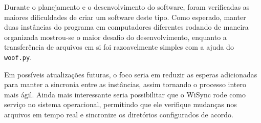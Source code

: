 \documentclass[12pt,a4paper]{ufpr}
\begin{document}
Durante o planejamento e o desenvolvimento do software, foram verificadas as maiores dificuldades de criar um software deste tipo.
Como esperado, manter duas instâncias do programa em computadores diferentes rodando de maneira organizada mostrou-se o maior desafio do desenvolvimento, enquanto a transferência de arquivos em si foi razoavelmente simples com a ajuda do \texttt{woof.py}.

Em possíveis atualizações futuras, o foco seria em reduzir as esperas adicionadas para manter a sincronia entre as instâncias, assim tornando o processo intero mais ágil.
Ainda mais interessante seria possibilitar que o WiSync rode como serviço no sistema operacional, permitindo que ele verifique mudanças nos arquivos em tempo real e sincronize os diretórios configurados de acordo.

%


%
%

\singlespacing
\end{document}
